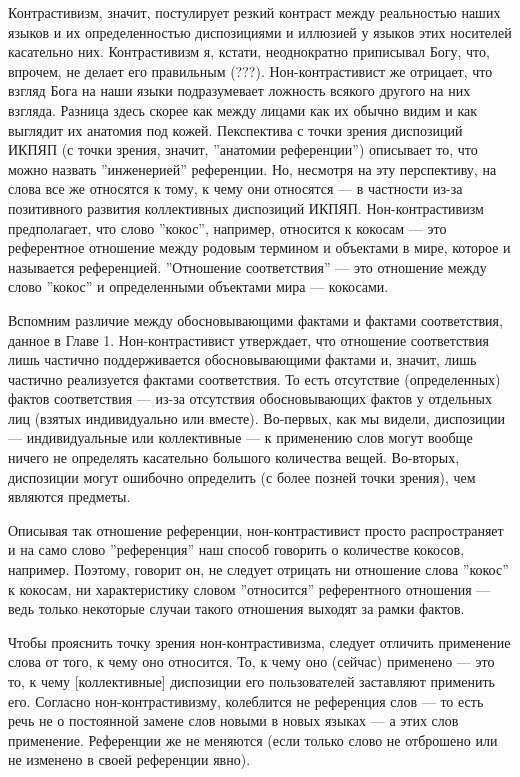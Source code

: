\documentclass[11pt]{book}
\begin{document}
Контрастивизм, значит, постулирует резкий контраст между реальностью наших языков и их определенностью диспозициями и иллюзией у языков этих носителей касательно них. Контрастивизм я, кстати, неоднократно приписывал Богу, что, впрочем, не делает его правильным (???). Нон-контрастивист же отрицает, что взгляд Бога на наши языки подразумевает ложность всякого другого на них взгляда. Разница здесь скорее как между лицами как их обычно видим и как выглядит их анатомия под кожей. Пекспектива с точки зрения диспозиций ИКПЯП (с точки зрения, значит, ''анатомии референции'') описывает то, что можно назвать ''инженерией'' референции. Но, несмотря на эту перспективу, на слова все же относятся к тому, к чему они относятся --- в частности из-за позитивного развития коллективных диспозиций ИКПЯП. Нон-контрастивизм предполагает, что слово ''кокос'', например, относится к кокосам --- это референтное отношение между родовым термином и объектами в мире, которое и называется референцией. ''Отношение соответствия'' --- это отношение между слово ''кокос'' и определенными объектами мира --- кокосами.

Вспомним различие между обосновывающими фактами и фактами соответствия, данное в Главе 1. Нон-контрастивист утверждает, что отношение соответствия лишь частично поддерживается обосновывающими фактами и, значит, лишь частично реализуется фактами соответствия. То есть отсутствие (определенных) фактов соответствия --- из-за отсутствия обосновывающих фактов у отдельных лиц (взятых индивидуально или вместе). Во-первых, как мы видели, диспозиции --- индивидуальные или коллективные --- к применению слов могут вообще ничего не определять касательно большого количества вещей. Во-вторых, диспозиции могут ошибочно определить (с более позней точки зрения), чем являются предметы.

Описывая так отношение референции, нон-контрастивист просто распространяет и на само слово ''референция'' наш способ говорить о количестве кокосов, например. Поэтому, говорит он, не следует отрицать ни отношение слова ''кокос'' к кокосам, ни характеристику словом ''относится'' референтного отношения --- ведь только некоторые случаи такого отношения выходят за рамки фактов.

Чтобы прояснить точку зрения нон-контрастивизма, следует отличить применение слова от того, к чему оно относится. То, к чему оно (сейчас) применено --- это то, к чему [коллективные] диспозиции его пользователей заставляют применить его. Согласно нон-контрастивизму, колеблится не референция слов --- то есть речь не о постоянной замене слов новыми в новых языках --- а этих слов применение. Референции же не меняются (если только слово не отброшено или не изменено в своей референции явно).
\end{document}

